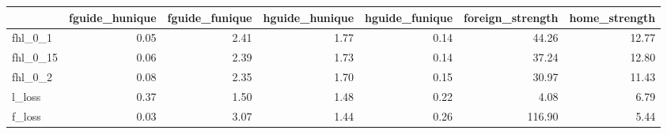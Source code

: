 \begin{tabular}{lrrrrrr}
\toprule
 & fguide_hunique & fguide_funique & hguide_hunique & hguide_funique & foreign_strength & home_strength \\
\midrule
fhl_0_1 & 0.05 & 2.41 & 1.77 & 0.14 & 44.26 & 12.77 \\
fhl_0_15 & 0.06 & 2.39 & 1.73 & 0.14 & 37.24 & 12.80 \\
fhl_0_2 & 0.08 & 2.35 & 1.70 & 0.15 & 30.97 & 11.43 \\
l_loss & 0.37 & 1.50 & 1.48 & 0.22 & 4.08 & 6.79 \\
f_loss & 0.03 & 3.07 & 1.44 & 0.26 & 116.90 & 5.44 \\
\bottomrule
\end{tabular}
